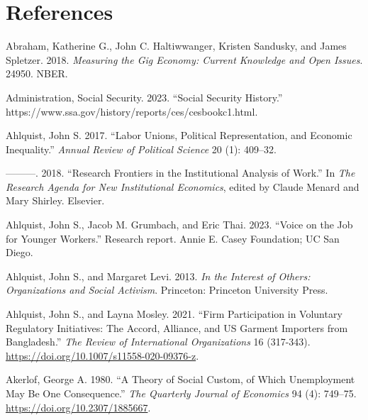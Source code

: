 \documentclass[
  11pt,
  oneside]{article}
\newlength{\cslhangindent}
\newenvironment{CSLReferences}[2] %
 {\begin{list}{}{%
  \setlength{\itemindent}{0pt}
  \setlength{\leftmargin}{0pt}
  \setlength{\parsep}{0pt}
  \ifodd #1
   \setlength{\leftmargin}{\cslhangindent}
   \setlength{\itemindent}{-1\cslhangindent}
  \fi
  \setlength{\itemsep}{#2\baselineskip}}}
 {\end{list}}
\begin{document}
\section*{References}\label{references}

\label{refs}
\begin{CSLReferences}{1}{0}
Abraham, Katherine G., John C. Haltiwwanger, Kristen Sandusky, and James Spletzer. 2018. \emph{Measuring the {Gig} {Economy}: Current Knowledge and Open Issues}. 24950. NBER.

Administration, Social Security. 2023. {``Social {Security History}.''} https://www.ssa.gov/history/reports/ces/cesbookc1.html.

Ahlquist, John S. 2017. {``Labor Unions, Political Representation, and Economic Inequality.''} \emph{Annual Review of Political Science} 20 (1): 409--32.

---------. 2018. {``Research {Frontiers} in the {Institutional} {Analysis} of {Work}.''} In \emph{The {Research} {Agenda} for {New} {Institutional} {Economics}}, edited by Claude Menard and Mary Shirley. Elsevier.

Ahlquist, John S., Jacob M. Grumbach, and Eric Thai. 2023. {``Voice on the Job for Younger Workers.''} Research report. Annie E. Casey Foundation; UC San Diego.

Ahlquist, John S., and Margaret Levi. 2013. \emph{In the {Interest} of {Others}: Organizations and Social Activism}. Princeton: Princeton University Press.

Ahlquist, John S., and Layna Mosley. 2021. {``Firm Participation in Voluntary Regulatory Initiatives: {The} {Accord}, {Alliance}, and {US} Garment Importers from {Bangladesh}.''} \emph{The Review of International Organizations} 16 (317-343). \url{https://doi.org/10.1007/s11558-020-09376-z}.

Akerlof, George A. 1980. {``A {Theory} of {Social} {Custom}, of Which {Unemployment} May Be {One} {Consequence}.''} \emph{The Quarterly Journal of Economics} 94 (4): 749--75. \url{https://doi.org/10.2307/1885667}.


\end{CSLReferences}
\end{document}
